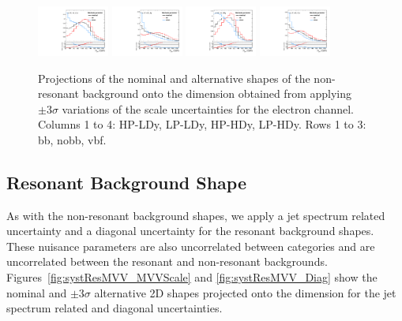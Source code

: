 \begin{figure}[htbp]
  \includegraphics[width=0.21\textwidth]{fig/uncertainties/systs_nonRes_e_HP_vbf_LDy_MJJScale_ProjY.pdf}
  \includegraphics[width=0.21\textwidth]{fig/uncertainties/systs_nonRes_e_LP_vbf_LDy_MJJScale_ProjY.pdf}
  \includegraphics[width=0.21\textwidth]{fig/uncertainties/systs_nonRes_e_HP_vbf_HDy_MJJScale_ProjY.pdf}
  \includegraphics[width=0.21\textwidth]{fig/uncertainties/systs_nonRes_e_LP_vbf_HDy_MJJScale_ProjY.pdf}\\
  \caption{
    Projections of the nominal and alternative shapes of the non-resonant background onto the \MJ dimension obtained from applying $\pm3\sigma$ variations of the \MJ scale uncertainties for the electron channel.
    Columns 1 to 4: HP-LDy, LP-LDy, HP-HDy, LP-HDy.
    Rows 1 to 3: bb, nobb, vbf.
  }
  \label{fig:systNonResMJ_MJJScale}
\end{figure}

\subsection{Resonant Background Shape}

As with the non-resonant background shapes, we apply a jet \pt spectrum related uncertainty and a diagonal uncertainty for the resonant background shapes.
These nuisance parameters are also uncorrelated between categories and are uncorrelated between the resonant and non-resonant backgrounds.
Figures~\ref{fig:systResMVV_MVVScale} and \ref{fig:systResMVV_Diag} show the nominal and $\pm3\sigma$ alternative 2D shapes projected onto the \MVV dimension for the jet \pt spectrum related and diagonal uncertainties.

